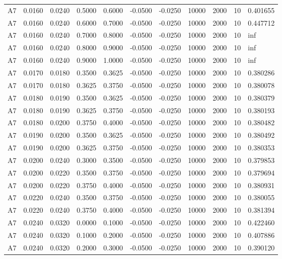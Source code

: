 \documentclass{article}
\begin{document}
\begin{longtable}{l r r r r r r r r r l}
A7 & 0.0160 & 0.0240 & 0.5000 & 0.6000 & -0.0500 & -0.0250 & 10000 & 2000 & 10 & 0.401655 \\
A7 & 0.0160 & 0.0240 & 0.6000 & 0.7000 & -0.0500 & -0.0250 & 10000 & 2000 & 10 & 0.447712 \\
A7 & 0.0160 & 0.0240 & 0.7000 & 0.8000 & -0.0500 & -0.0250 & 10000 & 2000 & 10 & inf \\
A7 & 0.0160 & 0.0240 & 0.8000 & 0.9000 & -0.0500 & -0.0250 & 10000 & 2000 & 10 & inf \\
A7 & 0.0160 & 0.0240 & 0.9000 & 1.0000 & -0.0500 & -0.0250 & 10000 & 2000 & 10 & inf \\
A7 & 0.0170 & 0.0180 & 0.3500 & 0.3625 & -0.0500 & -0.0250 & 10000 & 2000 & 10 & 0.380286 \\
A7 & 0.0170 & 0.0180 & 0.3625 & 0.3750 & -0.0500 & -0.0250 & 10000 & 2000 & 10 & 0.380078 \\
A7 & 0.0180 & 0.0190 & 0.3500 & 0.3625 & -0.0500 & -0.0250 & 10000 & 2000 & 10 & 0.380379 \\
A7 & 0.0180 & 0.0190 & 0.3625 & 0.3750 & -0.0500 & -0.0250 & 10000 & 2000 & 10 & 0.380193 \\
A7 & 0.0180 & 0.0200 & 0.3750 & 0.4000 & -0.0500 & -0.0250 & 10000 & 2000 & 10 & 0.380482 \\
A7 & 0.0190 & 0.0200 & 0.3500 & 0.3625 & -0.0500 & -0.0250 & 10000 & 2000 & 10 & 0.380492 \\
A7 & 0.0190 & 0.0200 & 0.3625 & 0.3750 & -0.0500 & -0.0250 & 10000 & 2000 & 10 & 0.380353 \\
A7 & 0.0200 & 0.0240 & 0.3000 & 0.3500 & -0.0500 & -0.0250 & 10000 & 2000 & 10 & 0.379853 \\
A7 & 0.0200 & 0.0220 & 0.3500 & 0.3750 & -0.0500 & -0.0250 & 10000 & 2000 & 10 & 0.379694 \\
A7 & 0.0200 & 0.0220 & 0.3750 & 0.4000 & -0.0500 & -0.0250 & 10000 & 2000 & 10 & 0.380931 \\
A7 & 0.0220 & 0.0240 & 0.3500 & 0.3750 & -0.0500 & -0.0250 & 10000 & 2000 & 10 & 0.380055 \\
A7 & 0.0220 & 0.0240 & 0.3750 & 0.4000 & -0.0500 & -0.0250 & 10000 & 2000 & 10 & 0.381394 \\
A7 & 0.0240 & 0.0320 & 0.0000 & 0.1000 & -0.0500 & -0.0250 & 10000 & 2000 & 10 & 0.422460 \\
A7 & 0.0240 & 0.0320 & 0.1000 & 0.2000 & -0.0500 & -0.0250 & 10000 & 2000 & 10 & 0.407886 \\
A7 & 0.0240 & 0.0320 & 0.2000 & 0.3000 & -0.0500 & -0.0250 & 10000 & 2000 & 10 & 0.390120 \\

\end{longtable}
\end{document}
